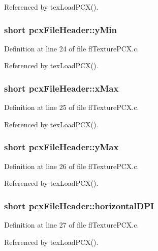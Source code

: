Referenced by tex\-Load\-PCX().
\subsubsection{\setlength{\rightskip}{0pt plus 5cm}short {\bf pcx\-File\-Header::y\-Min}}\label{structpcxFileHeader_69fa3ab1416c69fa7e0eb288ccc3849a}




Definition at line 24 of file fl\-Texture\-PCX.c.

Referenced by tex\-Load\-PCX().
\subsubsection{\setlength{\rightskip}{0pt plus 5cm}short {\bf pcx\-File\-Header::x\-Max}}\label{structpcxFileHeader_fcda63520f50fabc79f1fdd5d8ba0684}




Definition at line 25 of file fl\-Texture\-PCX.c.

Referenced by tex\-Load\-PCX().
\subsubsection{\setlength{\rightskip}{0pt plus 5cm}short {\bf pcx\-File\-Header::y\-Max}}\label{structpcxFileHeader_d647e0f9eda4717cb847948b3d6d40fe}




Definition at line 26 of file fl\-Texture\-PCX.c.

Referenced by tex\-Load\-PCX().
\subsubsection{\setlength{\rightskip}{0pt plus 5cm}short {\bf pcx\-File\-Header::horizontal\-DPI}}\label{structpcxFileHeader_03b1b0f063315c052b6d5e495aa96d0c}




Definition at line 27 of file fl\-Texture\-PCX.c.

Referenced by tex\-Load\-PCX().

